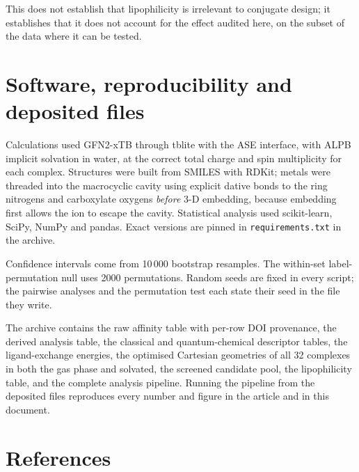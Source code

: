 \documentclass[11pt,a4paper]{article}
\begin{document}
This does not establish that lipophilicity is irrelevant to conjugate design; it establishes that it
does not account for the effect audited here, on the subset of the data where it can be tested.



\clearpage
\section{Software, reproducibility and deposited files}

Calculations used GFN2-xTB through \textsf{tblite} with the ASE interface, with ALPB implicit
solvation in water, at the correct total charge and spin multiplicity for each complex. Structures
were built from SMILES with RDKit; metals were threaded into the macrocyclic cavity using explicit
dative bonds to the ring nitrogens and carboxylate oxygens \emph{before} 3-D embedding, because
embedding first allows the ion to escape the cavity. Statistical analysis used scikit-learn,
SciPy, NumPy and pandas. Exact versions are pinned in \texttt{requirements.txt} in the archive.

Confidence intervals come from 10\,000 bootstrap resamples. The within-set label-permutation null
uses 2000 permutations. Random seeds are fixed in every script; the pairwise analyses and the
permutation test each state their seed in the file they write.

The archive contains the raw affinity table with per-row DOI provenance, the derived analysis table,
the classical and quantum-chemical descriptor tables, the ligand-exchange energies, the optimised
Cartesian geometries of all 32 complexes in both the gas phase and solvated, the screened candidate
pool, the lipophilicity table, and the complete analysis pipeline. Running the pipeline from the
deposited files reproduces every number and figure in the article and in this document.

\section*{References}
\end{document}
